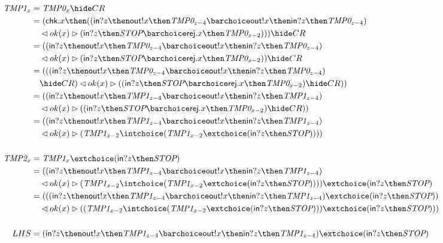 \documentclass[a4paper, 11pt]{article}
\def\Stop{\textit{STOP}}
\def\inc{\textsf{in}}
\def\chk{\textsf{chk}}
\def\rej{\textsf{rej}}
\def\outc{\textsf{out}}
\newcommand{\Tmp}[2]{\textit{TMP#1}_{#2}}
\begin{document}
\begin{align*}
    \Tmp{1}{x}
    &= \Tmp{0}{x} \hide CR \\
    &= (\chk . x \then ((\inc ? z \then \outc ! x \then \Tmp{0}{z-4} \barchoice \outc ! x \then \inc ? z \then \Tmp{0}{z-4}) \\
    &\quad \lhd ok(x) \rhd (\inc ? z \then \Stop \barchoice \rej . x \then \Tmp{0}{x-2}))) \hide CR \\
    &= ((\inc ? z \then \outc ! x \then \Tmp{0}{z-4} \barchoice \outc ! x \then \inc ? z \then \Tmp{0}{z-4}) \\
    &\quad \lhd ok(x) \rhd (\inc ? z \then \Stop \barchoice \rej . x \then \Tmp{0}{x-2})) \hide CR \\
    &= (((\inc ? z \then \outc ! x \then \Tmp{0}{z-4} \barchoice \outc ! x \then \inc ? z \then \Tmp{0}{z-4}) \\
    &\quad \hide CR) \lhd ok(x) \rhd ((\inc ? z \then \Stop \barchoice \rej . x \then \Tmp{0}{x-2}) \hide CR)) \\
    &= ((\inc ? z \then \outc ! x \then \Tmp{1}{z-4} \barchoice \outc ! x \then \inc ? z \then \Tmp{1}{z-4}) \\
    &\quad \lhd ok(x) \rhd ((\inc ? z \then \Stop \barchoice \rej . x \then \Tmp{0}{x-2}) \hide CR)) \\
    &= ((\inc ? z \then \outc ! x \then \Tmp{1}{z-4} \barchoice \outc ! x \then \inc ? z \then \Tmp{1}{z-4}) \\
    &\quad \lhd ok(x) \rhd (\Tmp{1}{x-2} \intchoice (\Tmp{1}{x-2} \extchoice (\inc ? z \then \Stop)))) \\ \\
    \Tmp{2}{x}
    &= \Tmp{1}{x} \extchoice (\inc ? z \then \Stop) \\
    &= ((\inc ? z \then \outc ! x \then \Tmp{1}{z-4} \barchoice \outc ! x \then \inc ? z \then \Tmp{1}{z-4}) \\
    &\quad \lhd ok(x) \rhd (\Tmp{1}{x-2} \intchoice (\Tmp{1}{x-2} \extchoice (\inc ? z \then \Stop)))) \extchoice (\inc ? z \then \Stop) \\
    &= (((\inc ? z \then \outc ! x \then \Tmp{1}{z-4} \barchoice \outc ! x \then \inc ? z \then \Tmp{1}{z-4}) \extchoice (\inc ? z \then \Stop)) \\
    &\quad \lhd ok(x) \rhd ((\Tmp{1}{x-2} \intchoice (\Tmp{1}{x-2} \extchoice (\inc ? z \then \Stop))) \extchoice (\inc ? z \then \Stop))) \\ \\
    LHS
    &= (\inc ? z \then \outc ! x \then \Tmp{1}{z-4} \barchoice \outc ! x \then \inc ? z \then \Tmp{1}{z-4}) \extchoice (\inc ? z \then \Stop) \\

\end{align*}
\end{document}
